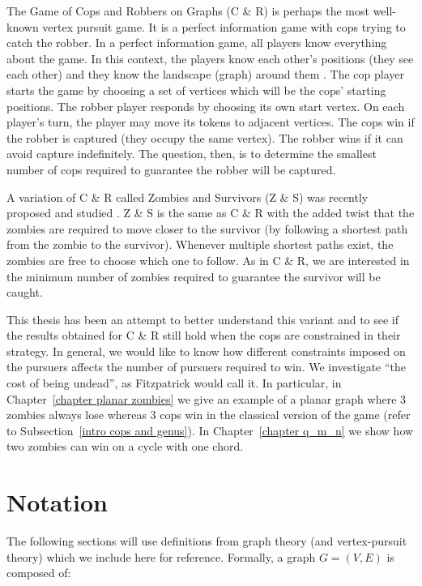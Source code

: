 The Game of Cops and Robbers on Graphs (C \& R) \cite{bonato2011game} is perhaps the most
well-known vertex pursuit game. It is a perfect information game with cops trying
to catch the robber. In a perfect information game, all players know everything about the game.
In this context, the players know each other's positions (they see each other) and they
know the landscape (graph) around them \cite{schaefer1978complexity}.
The cop player starts the game by choosing a set of vertices which will be the cops' starting positions. The robber player responds by choosing its own start vertex. On each player's turn, the player may move its tokens to adjacent vertices. The cops win if the robber is captured (they occupy the same vertex). The robber wins if it can avoid capture indefinitely. The question, then, is to determine the smallest number of cops required to guarantee the robber will be captured.

A variation of C \& R  called Zombies and Survivors (Z \& S) was recently proposed and studied \cite{fitzpatrick2016deterministic, fitzpatrick2018game}.
Z \& S is the same as C \& R with the added twist that the zombies are required to move closer to the survivor (by following a shortest path from the zombie to the survivor).
Whenever multiple shortest paths exist, the zombies are free to choose which one to follow. As in C \& R, we are interested in the minimum number of zombies required to guarantee the survivor will be caught.

This thesis has been an attempt to better understand this variant and
to see if the results obtained for C \& R still hold when the cops
are constrained in their strategy. In general, we would like to know how different constraints imposed on the pursuers affects the number of pursuers required to win. We investigate ``the cost of being undead'', as Fitzpatrick \cite{fitzpatrick2016deterministic} would call it.
In particular, in Chapter~\ref{chapter planar zombies}
we give an example of a planar graph where 3 zombies always lose whereas 3 cops win in the classical version of the game (refer to Subsection~\ref{intro cops and genus}).
In Chapter~\ref{chapter q_m_n} we show how two zombies can win on a cycle with one chord.

\section{Notation}

The following sections will use definitions from graph theory (and vertex-pursuit theory) which we include here for reference. Formally, a graph $G = (V, E)$ is composed of:

